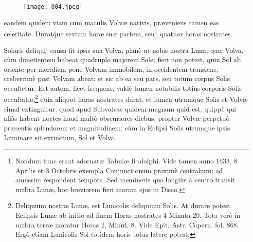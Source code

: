 \documentclass[a4paper, 11pt, oneside, polutonikogreek, german]{article}
\begin{document}
{\begin{figure}[H]
\centering
\texttt{[image: 004.jpeg]}
\end{figure}} eandem quidem viam cum maculis Volvæ nativis, præveniens tamen eas celeritate. Durat\'que sextam horæ suæ partem, seu\footnote{Nondum tunc erant adornatæ Tabulæ Rudolphi. Vide tamen anno 1633, 8 Aprilis et 3 Octobris exempla Conjunctionum proximè centralium; ad amussim respondent tempora. Sed memineris quo longiùs à centro transit umbra Lunæ, hoc breviorem fieri moram ejus in Disco.} quatuor horas nostrates.

Solaris deliquij causa fit ipsis sua Volva, planè ut nobis nostra Luna; quæ Volva, cùm dimetientem habeat quadruplo majorem Sole; fieri non potest, quin Sol ab oriente per meridiem pone Volvam immobilem, in occidentem transiens, creberrimè post Volvam abeat: et sic ab ea seu pars, seu totum corpus Solis occultetur. Est autem, licet frequens, valdè tamen notabilis totius corporis Solis occultatio,\footnote{Deliquium nostræ Lunæ, est Lunicolis deliquium Solis. At durare potest Eclipsis Lunæ ab initio ad finem Horas nostrates 4 Minuta 20. Tota verò in umbra terræ moratur Horas 2, Minut. 8. Vide Epit. Astr. Copern. fol. 868. Ergò etiam Lunicolis Sol totidem horis totus latere potest.} quia aliquot horas nostrates durat, et lumen utrumque Solis et Volvæ simul extinguitur, quod apud Subvolvas quidem magnum quid est, quippè qui aliàs habent noctes haud multò obscuriores diebus, propter Volvæ perpetuò præsentis splendorem et magnitudinem; cùm in Eclipsi Solis utrumque ipsis Luminare sit extinctum, Sol et Volva.
\end{document}

